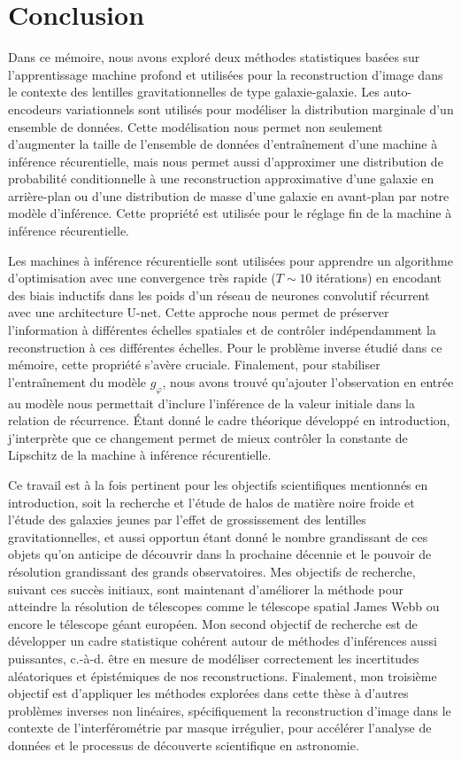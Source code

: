 \chapter{Conclusion}
Dans ce mémoire, nous avons exploré deux méthodes statistiques basées sur l'apprentissage machine profond et
utilisées pour la reconstruction d'image dans le contexte des lentilles gravitationnelles de type galaxie-galaxie.
Les auto-encodeurs variationnels sont utilisés pour modéliser la distribution marginale d'un 
ensemble de données. Cette modélisation nous permet non seulement d'augmenter la taille de l'ensemble 
de données d'entraînement d'une machine à inférence récurentielle, mais nous permet aussi d'approximer 
une distribution de probabilité conditionnelle à une reconstruction approximative d'une galaxie 
en arrière-plan ou d'une distribution de masse d'une galaxie en avant-plan par notre modèle d'inférence. 
Cette propriété est utilisée pour le réglage fin de la machine à inférence récurentielle.

Les machines à inférence récurentielle sont utilisées pour apprendre un algorithme d'optimisation avec une convergence 
très rapide ($T \sim 10$ itérations)
en encodant des biais inductifs dans les poids d'un réseau de neurones convolutif récurrent avec une architecture U-net. 
Cette approche nous permet de préserver l'information à différentes échelles spatiales et de contrôler indépendamment 
la reconstruction à ces différentes échelles. Pour le problème inverse étudié dans ce mémoire, cette propriété s'avère cruciale. 
Finalement, pour stabiliser l'entraînement du modèle $g_\varphi$, nous avons trouvé qu'ajouter l'observation 
en entrée au modèle nous permettait d'inclure l'inférence de la valeur initiale dans la relation de récurrence. Étant 
donné le cadre théorique développé en introduction, j'interprète que ce changement permet de mieux contrôler la constante de
Lipschitz de la machine à inférence récurentielle.

Ce travail est à la fois pertinent pour les objectifs scientifiques mentionnés en introduction, soit la recherche et l'étude 
de halos de matière noire froide et l'étude des galaxies jeunes par l'effet de grossissement des lentilles gravitationnelles, 
et aussi opportun étant donné le nombre grandissant de ces objets qu'on anticipe de découvrir dans la prochaine décennie et 
le pouvoir de résolution grandissant des grands observatoires. Mes objectifs de recherche, suivant ces succès initiaux, sont maintenant 
d'améliorer la méthode pour atteindre la résolution de télescopes comme le télescope spatial James Webb ou encore le télescope 
géant européen. Mon second objectif de recherche est de développer un cadre statistique cohérent autour de méthodes 
d'inférences aussi puissantes, c.-à-d. être en mesure de modéliser correctement les incertitudes aléatoriques et épistémiques 
de nos reconstructions. Finalement, mon troisième objectif est d'appliquer les méthodes explorées dans cette thèse à d'autres problèmes 
inverses non linéaires, spécifiquement la reconstruction d'image dans le contexte de l'interférométrie par masque irrégulier, 
pour accélérer l'analyse de données et le processus de découverte scientifique en astronomie.

